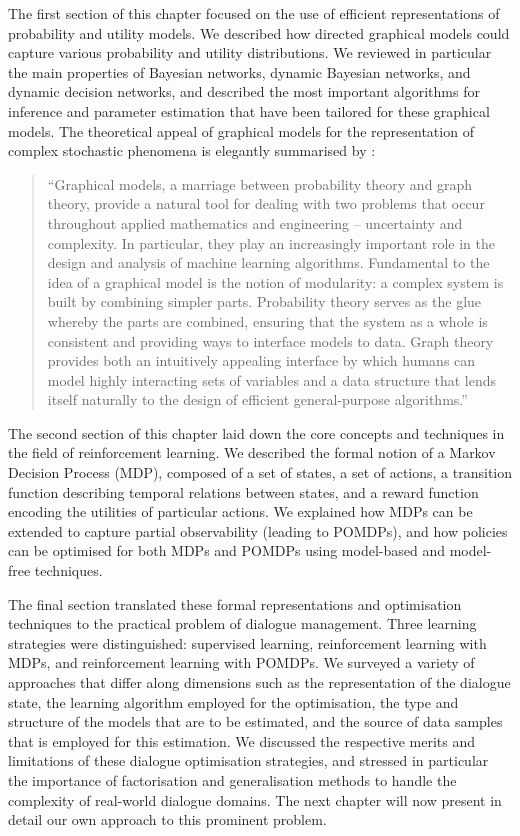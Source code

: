The first section of this chapter focused on the use of efficient representations of probability and utility models.  We described how directed graphical models could capture various probability and utility distributions. We reviewed in particular the main properties of Bayesian networks, dynamic Bayesian networks, and dynamic decision networks, and described the most important algorithms for inference and parameter estimation that have been tailored for these graphical models. The theoretical appeal of graphical models for the representation of complex stochastic phenomena is elegantly summarised by \citet[][p.~1]{jordan1998}: 
\begin{quote}
 ``Graphical models, a marriage between probability theory and graph theory, provide a natural tool for dealing with two problems that occur throughout applied mathematics and engineering -- uncertainty and complexity. In particular, they play an increasingly important role in the design and analysis of machine learning algorithms. Fundamental to the idea of a graphical model is the notion of modularity: a complex system is built by combining simpler parts. Probability theory serves as the glue whereby the parts are combined, ensuring that the system as a whole is consistent and providing ways to interface models to data. Graph theory provides both an intuitively appealing interface by which humans can model highly interacting sets of variables and a data structure that lends itself naturally to the design of efficient general-purpose algorithms.''
 \end{quote}

The second section of this chapter laid down the core concepts and techniques in the field of reinforcement learning.  We described the formal notion of a Markov Decision Process (MDP), composed of a set of states, a set of actions, a transition function describing temporal relations between states, and a reward function encoding the utilities of particular actions. We explained how MDPs can be extended to capture partial observability (leading to POMDPs), and how policies can be optimised for both MDPs and POMDPs using model-based and model-free techniques.

The final section translated these formal representations and optimisation techniques to the practical problem of dialogue management.  Three learning strategies were distinguished: supervised learning, reinforcement learning with MDPs, and reinforcement learning with POMDPs.  We surveyed a variety of approaches that differ along dimensions such as the representation of the dialogue state, the learning algorithm employed for the optimisation, the type and structure of the models that are to be estimated, and the source of data samples that is employed for this estimation. We discussed the respective merits and limitations of these dialogue optimisation strategies, and stressed in particular the importance of factorisation and generalisation methods to handle the complexity of real-world dialogue domains.  The next chapter will now present in detail our own approach to this prominent problem.

